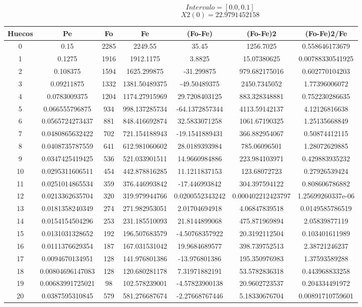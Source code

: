 \documentclass{article}
\begin{document}
$$
Intervalo = [0.0, 0.1]
$$
$$
X2(0) = 22.9791452158
$$
\begin{tabular}{|c|c|c|c|c|c|c|}
Huecos&Pe&Fo&Fe&(Fo{-}Fe)&(Fo{-}Fe)2&(Fo{-}Fe)2/Fe\\
\hline
0&0.15&2285&2249.55&35.45&1256.7025&0.558646173679\\
\hline
1&0.1275&1916&1912.1175&3.8825&15.07380625&0.00788330541925\\
\hline
2&0.108375&1594&1625.299875&{-}31.299875&979.682175016&0.602770104203\\
\hline
3&0.09211875&1332&1381.50489375&{-}49.50489375&2450.7345052&1.77396006072\\
\hline
4&0.0783009375&1204&1174.27915969&29.7208403125&883.328348881&0.752230286635\\
\hline
5&0.066555796875&934&998.137285734&{-}64.1372857344&4113.59142137&4.12126816638\\
\hline
6&0.0565724273437&881&848.416692874&32.5833071258&1061.67190325&1.25135668849\\
\hline
7&0.0480865632422&702&721.154188943&{-}19.1541889431&366.882954067&0.50874412115\\
\hline
8&0.0408735787559&641&612.981060602&28.0189393984&785.06096501&1.28072629885\\
\hline
9&0.0347425419425&536&521.033901511&14.9660984886&223.984103971&0.429883935232\\
\hline
10&0.0295311606511&454&442.878816285&11.1211837153&123.68072723&0.27926539424\\
\hline
11&0.0251014865534&359&376.446993842&{-}17.446993842&304.397594122&0.808606786882\\
\hline
12&0.0213362635704&320&319.979944766&0.0200552343242&0.000402212423797&1.25699260337e{-}06\\
\hline
13&0.0181358240349&274&271.982953051&2.01704694918&4.06847839518&0.0149585786519\\
\hline
14&0.0154154504296&253&231.185510093&21.8144899068&475.871969894&2.05839877119\\
\hline
15&0.0131031328652&192&196.507683579&{-}4.50768357922&20.3192112504&0.103401611989\\
\hline
16&0.0111376629354&187&167.031531042&19.9684689577&398.739752513&2.38721246237\\
\hline
17&0.0094670134951&128&141.976801386&{-}13.976801386&195.350976983&1.37593589288\\
\hline
18&0.00804696147083&128&120.680281178&7.31971882191&53.5782836318&0.443968833258\\
\hline
19&0.00683991725021&98&102.578239001&{-}4.57823900138&20.9602723537&0.204334491972\\
\hline
20&0.0387595310845&579&581.276687674&{-}2.27668767446&5.18330676704&0.00891710759601\\
\end{tabular}
\end{document}
